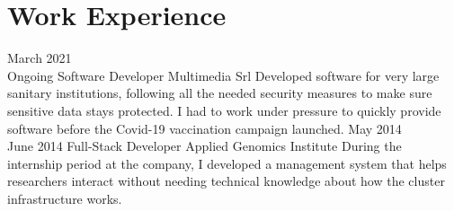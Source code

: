 \section*{Work Experience}
\begin{entrylist}
  \entry
    {March 2021\\ Ongoing}
    {Software Developer}
    {Multimedia Srl}
    {Developed software for very large sanitary institutions, following all the needed security measures to make sure sensitive data stays protected.
    I had to work under pressure to quickly provide software before the Covid-19 vaccination campaign launched.}
  \entry
    {May 2014\\ June 2014}
    {Full-Stack Developer}
    {Applied Genomics Institute}
    {During the internship period at the company, I developed a management system that helps researchers interact without needing technical knowledge about how the cluster infrastructure works.}
\end{entrylist}
